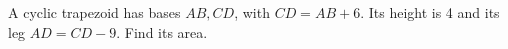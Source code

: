 A cyclic trapezoid has bases $ AB,CD $, with $ CD=AB+6 $. Its height is 4 and its leg $ AD=CD-9 $. Find its area.
